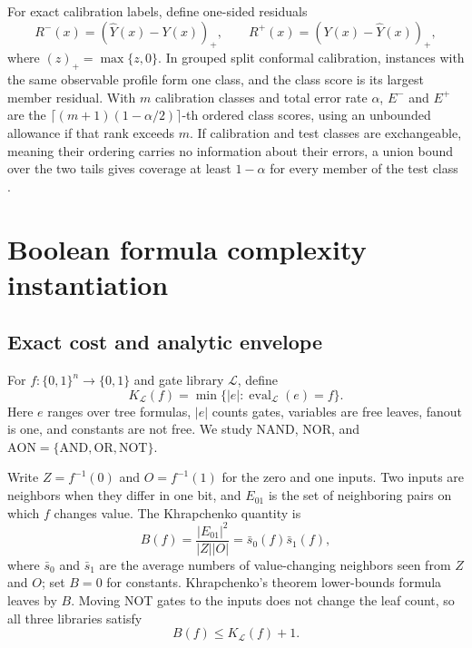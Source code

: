 \documentclass[10pt]{article}
\newcommand{\AON}{\mathrm{AON}}
\begin{document}
For exact calibration labels, define one-sided residuals
\begin{equation}
 R^-(x)=(\widehat Y(x)-Y(x))_+,
 \qquad R^+(x)=(Y(x)-\widehat Y(x))_+,
 \label{eq:residuals}
\end{equation}
where $(z)_+=\max\{z,0\}$.  In grouped split conformal calibration, instances
with the same observable profile form one class, and the class score is its
largest member residual.  With $m$ calibration classes and total error rate
$\alpha$, $E^-$ and $E^+$ are the
$\lceil(m+1)(1-\alpha/2)\rceil$-th ordered class scores, using an unbounded
allowance if that rank exceeds $m$.  If calibration and test classes are
exchangeable, meaning their ordering carries no information about their
errors, a union bound over the two tails gives coverage at least $1-\alpha$
for every member of the test class \cite{vovk2005,lei2018}.

\section{Boolean formula complexity instantiation}

\subsection{Exact cost and analytic envelope}

For $f:\{0,1\}^n\to\{0,1\}$ and gate library $\mathcal L$, define
\[
 K_{\mathcal L}(f)=\min\{|e|:\operatorname{eval}_{\mathcal L}(e)=f\}.
\]
Here $e$ ranges over tree formulas, $|e|$ counts gates, variables are free
leaves, fanout is one, and constants are not free.  We study NAND, NOR, and
$\AON=\{\text{AND},\text{OR},\text{NOT}\}$.

Write $Z=f^{-1}(0)$ and $O=f^{-1}(1)$ for the zero and one inputs.  Two inputs
are neighbors when they differ in one bit, and $E_{01}$ is the set of
neighboring pairs on which $f$ changes value.  The Khrapchenko quantity is
\begin{equation}
 B(f)=\frac{|E_{01}|^2}{|Z||O|}=\bar s_0(f)\bar s_1(f),
 \label{eq:khrapchenko}
\end{equation}
where $\bar s_0$ and $\bar s_1$ are the average numbers of value-changing
neighbors seen from $Z$ and $O$; set $B=0$ for constants.  Khrapchenko's
theorem lower-bounds formula leaves by $B$.  Moving NOT gates to the inputs
does not change the leaf count, so all three libraries satisfy
\begin{equation}
 B(f)\le K_{\mathcal L}(f)+1.
 \label{eq:lower}
\end{equation}
\end{document}
